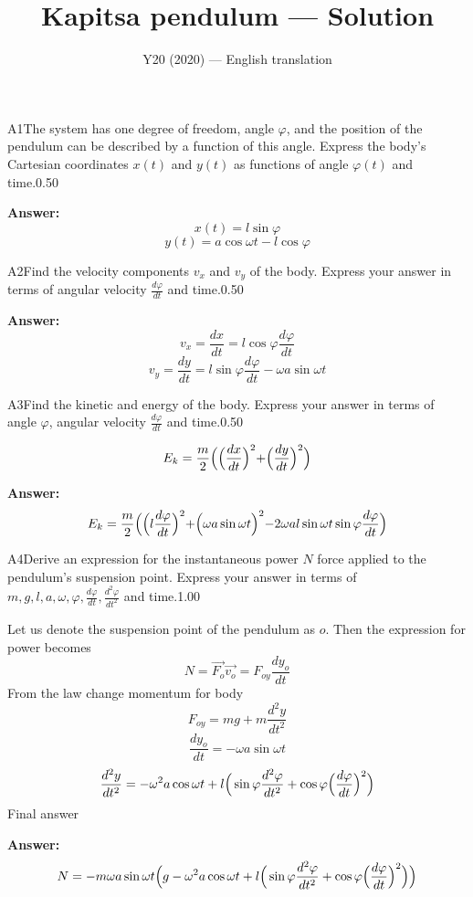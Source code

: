 \documentclass[11pt,a4paper]{article}
\title{\textbf{Kapitsa pendulum --- Solution}}
\author{\normalsize Y20 (2020) — English translation}
\date{}
\begin{document}
\maketitle\vspace{-0.5em}
\begin{solcard}{A1}{The system has one degree of freedom, angle $\varphi$, and the position of the pendulum can be described by a function of this angle. Express the body's Cartesian coordinates $x(t)$ and $y(t)$ as functions of angle $\varphi(t)$ and time.}{0.50}
\par\smallskip\noindent\textbf{Answer:} $$x(t)=l\sin\varphi $$ $$y(t)=a\cos{\omega}t-l\cos\varphi $$
\end{solcard}

\begin{solcard}{A2}{Find the velocity components $v_x$ and $v_y$ of the body. Express your answer in terms of angular velocity $\frac{d\varphi}{dt}$ and time.}{0.50}
\par\smallskip\noindent\textbf{Answer:} $$v_x=\frac{dx}{dt}=l\cos{\varphi}\frac{d\varphi}{dt} $$ $$v_y=\frac{dy}{dt}=l\sin{\varphi}\frac{d\varphi}{dt}-{\omega}a\sin{\omega}t $$
\end{solcard}

\begin{solcard}{A3}{Find the kinetic and energy of the body. Express your answer in terms of angle $\varphi$, angular velocity $\frac{d\varphi}{dt}$ and time.}{0.50}

$$E_k=\frac{m}{2}\Bigr(\Bigr(\frac{dx}{dt}\Bigl)^2+\Bigr(\frac{dy}{dt}\Bigl)^2\Bigl) $$

\par\smallskip\noindent\textbf{Answer:} $$E_k=\frac{m}{2}\Bigr(\Bigr(l\frac{d\varphi}{dt}\Bigl)^2+\Bigr({\omega}a  \sin{\omega}t\Bigl)^2-2{\omega}al \sin{\omega}t \sin{\varphi}\frac{d\varphi}{dt}\Bigl) $$
\end{solcard}

\begin{solcard}{A4}{Derive an expression for the instantaneous power $N$ force applied to the pendulum's suspension point. Express your answer in terms of $m, g, l, a, \omega, \varphi, \frac{d\varphi}{dt}, \frac{d^2\varphi}{dt^2}$ and time.}{1.00}

Let us denote the suspension point of the pendulum as $o$. Then the expression for power becomes $$N=\vec{F_o}\vec{v_o}=F_{oy}\frac{dy_o}{dt} $$From the law change momentum for body $$F_{oy}=mg+m\frac{d^2y}{dt^2} $$$$\frac{dy_o}{dt}=-{\omega}a\sin{\omega}t $$$$\frac{d^2y}{dt^2}=- {\omega}^2 a \cos{\omega}t + l\Bigr(\sin{\varphi} \frac{d^2{\varphi}}{dt^2}+\cos{\varphi}\Bigr(\frac{d\varphi}{dt}\Bigl)^{2}\Bigl) $$Final answer

\par\smallskip\noindent\textbf{Answer:} $$N=-m{\omega}a\sin{\omega}t\Bigr(g - {\omega}^2 a \cos{\omega}t + l\Bigr(\sin{\varphi} \frac{d^2{\varphi}}{dt^2}+\cos{\varphi}\Bigr(\frac{d\varphi}{dt}\Bigl)^{2}\Bigl)\Bigl) $$
\end{solcard}
\end{document}
